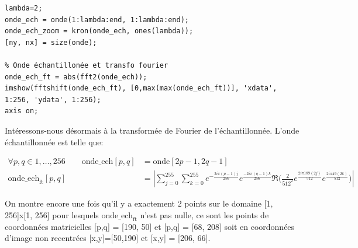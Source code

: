 \documentclass[a4paper, 11pt]{article}
\begin{document}
\begin{lstlisting}[frame=single]
% Sous échantillonnage facteur 2 onde
lambda=2;
onde_ech = onde(1:lambda:end, 1:lambda:end);
onde_ech_zoom = kron(onde_ech, ones(lambda));
[ny, nx] = size(onde);

% Onde échantillonée et transfo fourier
onde_ech_ft = abs(fft2(onde_ech));
imshow(fftshift(onde_ech_ft), [0,max(max(onde_ech_ft))], 'xdata', 1:256, 'ydata', 1:256);
axis on;
\end{lstlisting}

Intéressons-nous désormais à la transformée de Fourier de l'échantillonnée. L'onde échantillonnée est telle que:

\begin{align}
\forall p, q \in 1,\dots,256 \qquad \text{onde\_ech}[p,q] &= \text{onde}[2p-1, 2q-1] \\
\text{onde\_ech}_{\text{ft}}[p,q] &= \left| \sum_{j=0}^{255} \sum_{k=0}^{255} e^{-\frac{2i\pi(p-1)j}{256}}
e^{\frac{-2i\pi(q-1)k}{256}} \Re{\Big(\frac{2}{512^2} e^{\frac{2i\pi189(2j)}{512}} e^{\frac{2i\pi49(2k)}{512}}\Big)}  \right|
\end{align}

On montre encore une fois qu'il y a exactement 2 points sur le domaine [1, 256]x[1, 256] pour lesquels
$\text{onde\_ech}_{\text{ft}}$ n'est pas nulle, ce sont les points de coordonnées matricielles [p,q] = [190, 50] et
[p,q] = [68, 208] soit en coordonnées d'image non recentrées [x,y]=[50,190] et [x,y] = [206, 66]. 

\pagebreak

\begin{figure}[!h]
\centering
{}%
\qquad
{}%
\end{figure}
\end{document}
